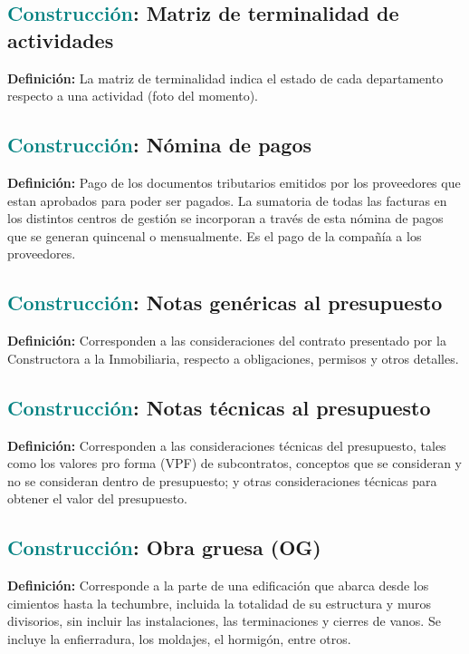 \documentclass[12pt]{article}
\begin{document}
\subsection{\textcolor{teal}{Construcción}: Matriz de terminalidad de actividades}
\textbf{Definición:} La matriz de terminalidad indica el estado de cada departamento respecto a una actividad (foto del momento).
\subsection{\textcolor{teal}{Construcción}: Nómina de pagos}
\textbf{Definición:} Pago de los documentos tributarios emitidos por los proveedores que estan aprobados para poder ser pagados. La sumatoria de todas las facturas en los distintos centros de gestión se incorporan a través de esta nómina de pagos que se generan quincenal o mensualmente. Es el pago de la compañía a los proveedores.
\subsection{\textcolor{teal}{Construcción}: Notas genéricas al presupuesto}
\textbf{Definición:} Corresponden a las consideraciones del contrato presentado por la Constructora a la Inmobiliaria, respecto a obligaciones, permisos y otros detalles.
\subsection{\textcolor{teal}{Construcción}: Notas técnicas al presupuesto}
\textbf{Definición:} Corresponden a las consideraciones técnicas del presupuesto, tales como los valores pro forma (VPF) de subcontratos, conceptos que se consideran y no se consideran dentro de presupuesto; y otras consideraciones técnicas para obtener el valor del presupuesto.
\subsection{\textcolor{teal}{Construcción}: Obra gruesa (OG)}
\textbf{Definición:} Corresponde a la parte de una edificación que abarca desde los cimientos hasta la techumbre, incluida la totalidad de su estructura y muros divisorios, sin incluir las instalaciones, las terminaciones y cierres de vanos. Se incluye la enfierradura, los moldajes, el hormigón, entre otros.
\end{document}
